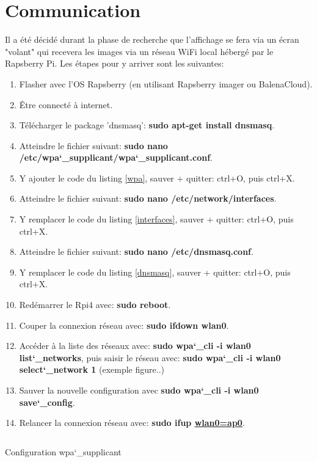 \section{Communication}
Il a été décidé durant la phase de recherche que l'affichage se fera via un écran "volant" qui recevera les images via un réseau WiFi local
hébergé par le Rapsberry Pi. Les étapes pour y arriver sont les suivantes:
\begin{enumerate}
    \item Flasher avec l'OS Rapsberry (en utilisant Rapsberry imager ou BalenaCloud).
    \item Être connecté à internet.
    \item Télécharger le package 'dnsmasq': \textbf{sudo apt-get install dnsmasq}.
    \item Atteindre le fichier suivant: \textbf{sudo nano /etc/wpa\char`_supplicant/wpa\char`_supplicant.conf}.
    \item Y ajouter le code du listing \ref{wpa}, sauver + quitter: ctrl+O, puis ctrl+X.
    \item Atteindre le fichier suivant: \textbf{sudo nano /etc/network/interfaces}.
    \item Y remplacer le code du listing \ref{interfaces}, sauver + quitter: ctrl+O, puis ctrl+X.
    \item Atteindre le fichier suivant: \textbf{sudo nano /etc/dnsmasq.conf}.
    \item Y remplacer le code du listing \ref{dnsmasq}, sauver + quitter: ctrl+O, puis ctrl+X.
    \item Redémarrer le Rpi4 avec: \textbf{sudo reboot}.
    \item Couper la connexion réseau avec: \textbf{sudo ifdown wlan0}.
    \item Accéder à la liste des réseaux avec: \textbf{sudo wpa\char`_cli -i wlan0 list\char`_networks}, puis saisir le réseau avec: \textbf{sudo wpa\char`_cli -i wlan0 select\char`_network 1} (exemple figure..)
    \item Sauver la nouvelle configuration avec \textbf{sudo wpa\char`_cli -i wlan0 save\char`_config}.
    \item Relancer la connexion réseau avec: \textbf{sudo ifup \underline{wlan0=ap0}}.
\end{enumerate}
\begin{listing}[ht]
    \inputminted{makefile}{assets/figures/wpa_supplicant.make}
    \caption{Configuration wpa\char`_supplicant \label{wpa}}
\end{listing}

